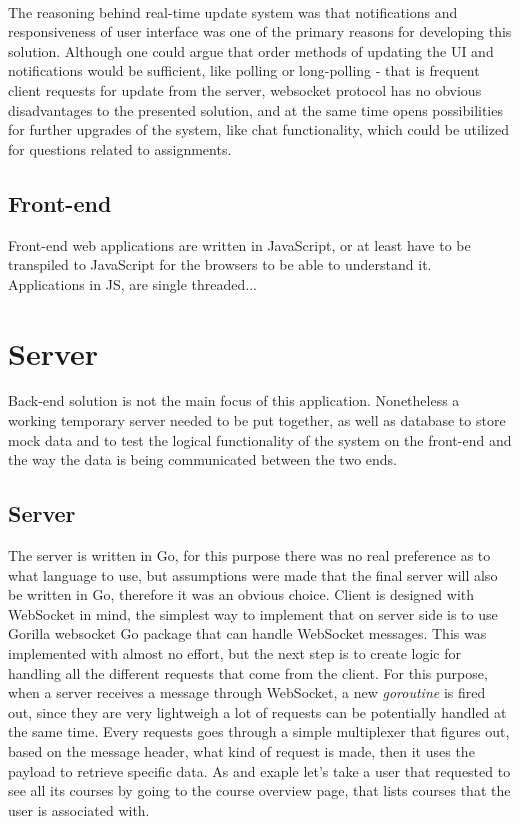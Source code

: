 \\The reasoning behind real-time update system was that notifications and responsiveness of user interface was one of the primary reasons for developing this solution. Although one could argue that order methods of updating the UI and notifications would be sufficient, like polling or long-polling - that is frequent client requests for update from the server, websocket protocol has no obvious disadvantages to the presented solution, and at the same time opens possibilities for further upgrades of the system, like chat functionality, which could be utilized for questions related to assignments.
\subsection{Front-end}
Front-end web applications are written in JavaScript, or at least have to be transpiled to JavaScript for the browsers to be able to understand it. Applications in JS, are single threaded...

\section{Server}
Back-end solution is not the main focus of this application. Nonetheless a working temporary server needed to be put together, as well as database to store mock data and to test the logical functionality of the system on the front-end and the way the data is being communicated between the two ends.
\subsection{Server}
The server is written in Go, for this purpose there was no real  preference as to what language to use, but assumptions were made that the final server will also be written in Go, therefore it was an obvious choice. Client is designed with WebSocket in mind, the simplest way to implement that on server side is to use Gorilla websocket Go package that can handle WebSocket messages. This was implemented with almost no effort, but the next step is to create logic for handling all the different requests that come from the client. For this purpose, when a server receives a message through WebSocket, a new \emph{goroutine} is fired out, since they are very lightweigh a lot of requests can be potentially handled at the same time. Every requests goes through a simple multiplexer that figures out, based on the message header, what kind of request is made, then it uses the payload to retrieve specific data. As and exaple let's take a user that requested to see all its courses by going to the course overview page, that lists courses that the user is associated with.

